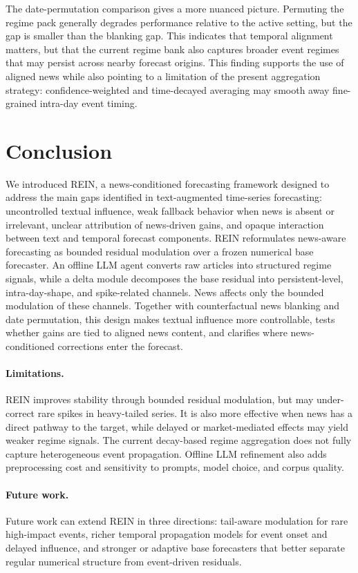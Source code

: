 \documentclass{article}
\newcommand{\method}{REIN\xspace}
\begin{document}
The date-permutation comparison gives a more nuanced picture. Permuting the regime pack generally degrades performance relative to the active setting, but the gap is smaller than the blanking gap. This indicates that temporal alignment matters, but that the current regime bank also captures broader event regimes that may persist across nearby forecast origins. This finding supports the use of aligned news while also pointing to a limitation of the present aggregation strategy: confidence-weighted and time-decayed averaging may smooth away fine-grained intra-day event timing.


\section{Conclusion}

We introduced \method, a news-conditioned forecasting framework designed to address the main gaps identified in text-augmented time-series forecasting: uncontrolled textual influence, weak fallback behavior when news is absent or irrelevant, unclear attribution of news-driven gains, and opaque interaction between text and temporal forecast components. \method reformulates news-aware forecasting as bounded residual modulation over a frozen numerical base forecaster. An offline LLM agent converts raw articles into structured regime signals, while a delta module decomposes the base residual into persistent-level, intra-day-shape, and spike-related channels. News affects only the bounded modulation of these channels. Together with counterfactual news blanking and date permutation, this design makes textual influence more controllable, tests whether gains are tied to aligned news content, and clarifies where news-conditioned corrections enter the forecast.

\paragraph{Limitations.}
\method improves stability through bounded residual modulation, but may under-correct rare spikes in heavy-tailed series. It is also more effective when news has a direct pathway to the target, while delayed or market-mediated effects may yield weaker regime signals. The current decay-based regime aggregation does not fully capture heterogeneous event propagation. Offline LLM refinement also adds preprocessing cost and sensitivity to prompts, model choice, and corpus quality.

\paragraph{Future work.}
Future work can extend \method in three directions: tail-aware modulation for rare high-impact events, richer temporal propagation models for event onset and delayed influence, and stronger or adaptive base forecasters that better separate regular numerical structure from event-driven residuals.
\end{document}
